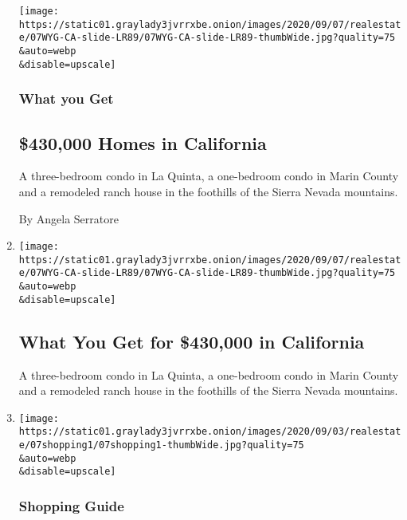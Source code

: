 \begin{enumerate}
  \texttt{[image: https://static01.graylady3jvrrxbe.onion/images/2020/09/07/realestate/07WYG-CA-slide-LR89/07WYG-CA-slide-LR89-thumbWide.jpg?quality=75\\\&auto=webp\\\&disable=upscale]}

  \hypertarget{what-you-get-1}{%
  \subsubsection{What you Get}\label{what-you-get-1}}

  \hypertarget{430000-homes-in-california}{%
  \subsection{\$430,000 Homes in
  California}\label{430000-homes-in-california}}

  A three-bedroom condo in La Quinta, a one-bedroom condo in Marin
  County and a remodeled ranch house in the foothills of the Sierra
  Nevada mountains.

  By Angela Serratore
\item
  \href{/slideshow/2020/09/07/realestate/what-you-get-for-430000-in-california.html}{}

  \texttt{[image: https://static01.graylady3jvrrxbe.onion/images/2020/09/07/realestate/07WYG-CA-slide-LR89/07WYG-CA-slide-LR89-thumbWide.jpg?quality=75\\\&auto=webp\\\&disable=upscale]}

  \hypertarget{what-you-get-for-430000-in-california}{%
  \subsection{What You Get for \$430,000 in
  California}\label{what-you-get-for-430000-in-california}}

  A three-bedroom condo in La Quinta, a one-bedroom condo in Marin
  County and a remodeled ranch house in the foothills of the Sierra
  Nevada mountains.
\item
  \href{/2020/09/07/realestate/shopping-for-compact-lounge-chairs.html}{}

  \texttt{[image: https://static01.graylady3jvrrxbe.onion/images/2020/09/03/realestate/07shopping1/07shopping1-thumbWide.jpg?quality=75\\\&auto=webp\\\&disable=upscale]}

  \hypertarget{shopping-guide}{%
  \subsubsection{Shopping Guide}\label{shopping-guide}}


\end{enumerate}
